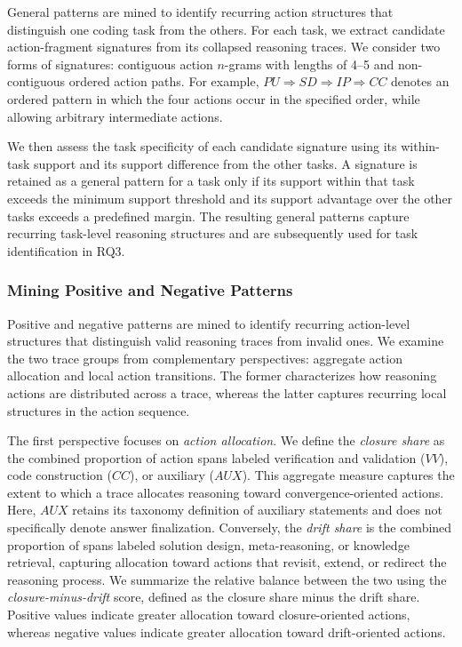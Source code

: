 \documentclass[acmsmall,screen,review,anonymous]{acmart}
\begin{document}
General patterns are mined to identify recurring action structures that distinguish one coding task from the others. For each task, we extract candidate action-fragment signatures from its collapsed reasoning traces. We consider two forms of signatures: contiguous action \(n\)-grams with lengths of 4--5 and non-contiguous ordered action paths. For example, \(PU\Rightarrow SD\Rightarrow IP\Rightarrow CC\) denotes an ordered pattern in which the four actions occur in the specified order, while allowing arbitrary intermediate actions.

We then assess the task specificity of each candidate signature using its within-task support and its support difference from the other tasks. A signature is retained as a general pattern for a task only if its support within that task exceeds the minimum support threshold and its support advantage over the other tasks exceeds a predefined margin. The resulting general patterns capture recurring task-level reasoning structures and are subsequently used for task identification in RQ3.


\subsubsection{\textbf{Mining Positive and Negative Patterns}}
\label{sec:pattern-discovery}

Positive and negative patterns are mined to identify recurring action-level structures that distinguish valid reasoning traces from invalid ones. We examine the two trace groups from complementary perspectives: aggregate action allocation and local action transitions. The former characterizes how reasoning actions are distributed across a trace, whereas the latter captures recurring local structures in the action sequence.

The first perspective focuses on \emph{action allocation}. We define the \emph{closure share} as the combined proportion of action spans labeled verification and validation (\(VV\)), code construction (\(CC\)), or auxiliary (\(AUX\)). This aggregate measure captures the extent to which a trace allocates reasoning toward convergence-oriented actions. Here, \(AUX\) retains its taxonomy definition of auxiliary statements and does not specifically denote answer finalization. Conversely, the \emph{drift share} is the combined proportion of spans labeled solution design, meta-reasoning, or knowledge retrieval, capturing allocation toward actions that revisit, extend, or redirect the reasoning process. We summarize the relative balance between the two using the \emph{closure-minus-drift} score, defined as the closure share minus the drift share. Positive values indicate greater allocation toward closure-oriented actions, whereas negative values indicate greater allocation toward drift-oriented actions.
\end{document}
